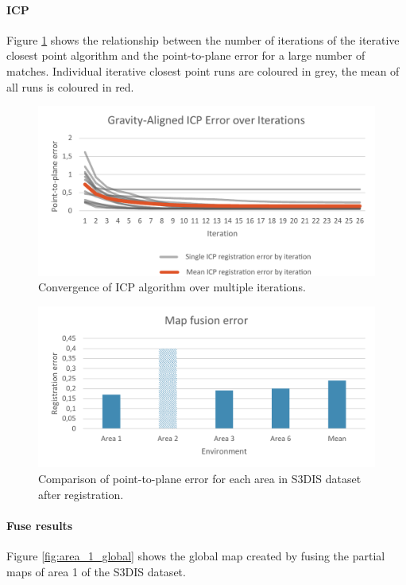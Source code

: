 \paragraph{ICP}
Figure \ref{fig:icp_convergence} shows the relationship between the number of iterations of the iterative closest point algorithm and the point-to-plane error for a large number of matches. Individual iterative closest point runs are coloured in grey, the mean of all runs is coloured in red.

\begin{figure}[h]
    \centering
    \includegraphics*[width=\textwidth]{./fig/icp_convergence.pdf}
    \caption{Convergence of ICP algorithm over multiple iterations.}
    \label{fig:icp_convergence}
\end{figure}

\begin{figure}[h]
    \centering
    \includegraphics*[width=\textwidth]{./fig/map_fuse_chart.pdf}
    \caption{Comparison of point-to-plane error for each area in S3DIS dataset after registration.}
    \label{fig:map_fuse_chart}
\end{figure}

\paragraph{Fuse results}
Figure \ref{fig:area_1_global} shows the global map created by fusing the partial maps of area 1 of the S3DIS dataset. 

